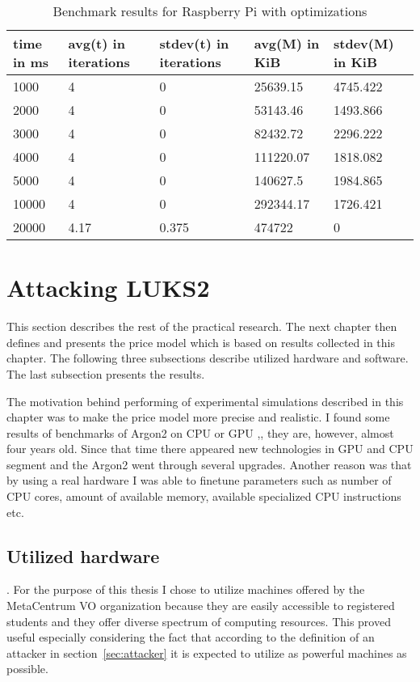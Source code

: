 \documentclass[nolof]{fithesis3}
\begin{document}
\noindent
\begin{table}
\caption{Benchmark results for Raspberry Pi with optimizations}
\label{tab:r4c1go}
\begin{tabularx}{\textwidth}{| X | X | X | X | X |}
\hline
time in ms & avg(t)  in iterations & stdev(t) in iterations & avg(M) in KiB & stdev(M) in KiB\\
\hline
1000 & 4 & 0 & 25639.15 & 4745.422\\
\hline
2000 & 4 & 0 & 53143.46 & 1493.866\\
\hline
3000 & 4 & 0 & 82432.72 & 2296.222\\
\hline
4000 & 4 & 0 & 111220.07 & 1818.082\\
\hline
5000 & 4 & 0 & 140627.5 & 1984.865\\
\hline
10000 & 4 & 0 & 292344.17 & 1726.421\\
\hline
20000 & 4.17 & 0.375 & 474722 & 0\\
\hline
\end{tabularx}
\end{table}


\FloatBarrier

\section{Attacking LUKS2}
\label{sec:attack}
This section describes the rest of the practical research. The next chapter then defines and presents the price model which is based on results collected in this chapter. The following three subsections describe utilized hardware and software. The last subsection presents the results.

The motivation behind performing of experimental simulations described in this chapter was to make the price model more precise and realistic. I found some results of benchmarks of Argon2 on CPU or GPU \parencite{argon2gpuold},, they are, however, almost four years old. Since that time there appeared new technologies in GPU and CPU segment and the Argon2 went through several upgrades. Another reason was that  by using a real hardware I was able to finetune parameters such as number of CPU cores, amount of available memory, available specialized CPU instructions etc.

\subsection{Utilized hardware}
. For the purpose of this thesis I chose to utilize machines offered by the MetaCentrum VO organization because they are easily accessible to registered students and they offer diverse spectrum of computing resources. This proved useful especially considering the fact that according to the definition of an attacker in section~\ref{sec:attacker} it is expected to utilize as powerful machines as possible.
\end{document}
